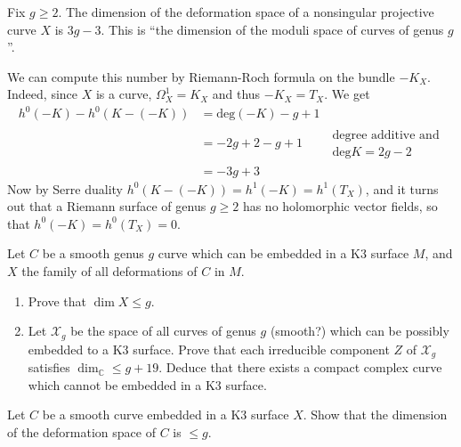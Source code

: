 \begin{example}
\label{example-modul-space-nonsi-riema}
\begin{reference}
\cite[Example 3.1]{continued-fractions}
\end{reference}
Fix $g \geq 2$. The dimension of the
deformation space of a nonsingular
projective curve $X$ is $3g-3$. This is ``the
dimension of the moduli space of
curves of genus $g$''.

We can compute this number by Riemann-Roch
formula on the bundle $-K_X$.
Indeed, since $X$ is a curve,
$\Omega_X^1=K_X$ and thus $-K_X=T_X$. We get
$$
\begin{aligned}
h^0(-K)-h^0(K-(-K))&=\text{deg}(-K)-g+1\\
&=-2g+2-g+1\qquad \substack{\text{degree
additive and}\\ \text{deg}K=2g-2}\\
&=-3g+3
\end{aligned}
$$
Now by Serre duality
$h^0(K-(-K))=h^1(-K)=h^1(T_X)$, and it turns
out that a
Riemann surface of genus $g \geq 2$ has no
holomorphic vector fields, so that
$h^0(-K)=h^0(T_X)=0$.
\end{example}

\begin{exercise}
\label{exercise-deformations-of-curves-in-K3}
Let $C$ be a smooth genus $g$ curve which can
be embedded in a K3 surface  $M$,
and $X$ the family of all deformations of $C$
in $M$.
\begin{enumerate}
\item Prove that $\dim X \leq  g$.
\item Let $\mathcal{X}_g$ be the space of all
curves of genus $g$ (smooth?)
which can be possibly embedded to a K3
surface. Prove that each irreducible
component $Z$ of $\mathcal{X}_g$ satisfies
$\dim_\mathbb{C} \leq  g+19$. Deduce
that there exists a compact complex curve
which cannot be embedded in a K3
surface.
\end{enumerate}
\end{exercise}

\begin{exercise}
\label{exercise-}
Let $C$ be a smooth curve embedded in a K3
surface $X$. Show that the dimension
of the deformation space of $C$ is $\leq g$.
\end{exercise}

